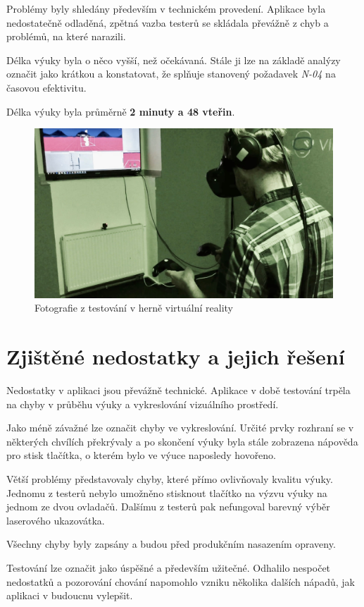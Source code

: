 Problémy byly shledány především v technickém provedení. Aplikace 
byla nedostatečně odladěná, zpětná vazba testerů se skládala 
převážně z chyb a problémů, na které narazili.

Délka výuky byla o něco vyšší, než očekávaná. Stále ji lze na základě analýzy označit
jako krátkou a konstatovat, že splňuje stanovený požadavek \emph{N-04} na časovou efektivitu.

Délka výuky byla průměrně \textbf{2 minuty a 48 vteřin}.

\begin{figure}[h!]
\centering
\includegraphics[width=12cm]{src/assets/testing.jpg}
\caption{Fotografie z testování v herně virtuální reality}
\end{figure}

\section{Zjištěné nedostatky a jejich řešení}\label{zjiux161tux11bnuxe9-nedostatky}

Nedostatky v aplikaci jsou převážně technické. Aplikace v době testování trpěla na
chyby v průběhu výuky a vykreslování vizuálního prostředí.

Jako méně závažné lze označit chyby ve vykreslování. Určité prvky rozhraní se v některých
chvílích překrývaly a po skončení výuky byla stále zobrazena nápověda pro stisk
tlačítka, o kterém bylo ve výuce naposledy hovořeno.

Větší problémy představovaly chyby, které přímo ovlivňovaly kvalitu 
výuky. Jednomu z testerů nebylo umožněno stisknout tlačítko na výzvu 
výuky na jednom ze dvou ovladačů. Dalšímu z testerů pak nefungoval 
barevný výběr laserového ukazovátka.

Všechny chyby byly zapsány a budou před produkčním nasazením opraveny.

Testování lze označit jako úspěšné a především užitečné. Odhalilo 
nespočet nedostatků a pozorování chování napomohlo vzniku
několika dalších nápadů, jak aplikaci v budoucnu vylepšit.